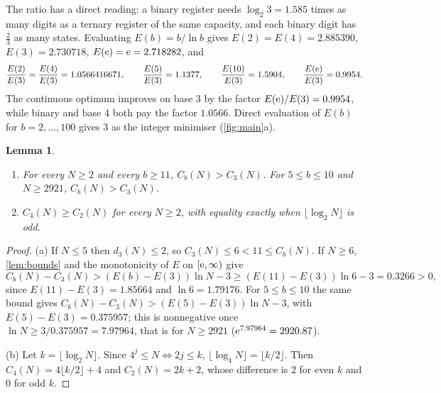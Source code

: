 \documentclass[11pt]{article}
\newtheorem{lemma}[theorem]{Lemma}
\theoremstyle{definition}\newtheorem{definition}[theorem]{Definition}
\theoremstyle{remark}\newtheorem{remark}[theorem]{Remark}
\begin{document}
The ratio has a direct reading: a binary register needs $\log_{2}3=1.585$ times as many digits as a ternary register of the same capacity, and each binary digit has $\frac23$ as many states. Evaluating $E(b)=b/\ln b$ gives $E(2)=E(4)=2.885390$, $E(3)=2.730718$, $E(\mathrm e)=\mathrm e=2.718282$, and
\[
\frac{E(2)}{E(3)}=\frac{E(4)}{E(3)}=1.0566416671,\qquad \frac{E(5)}{E(3)}=1.1377,\qquad \frac{E(10)}{E(3)}=1.5904,\qquad \frac{E(\mathrm e)}{E(3)}=0.9954 .
\]
The continuous optimum improves on base 3 by the factor $E(\mathrm e)/E(3)=0.9954$, while binary and base 4 both pay the factor $1.0566$. Direct evaluation of $E(b)$ for $b=2,\dots,100$ gives $3$ as the integer minimiser (\cref{fig:main}a).

\begin{lemma}\label{lem:large}
\leavevmode
\begin{enumerate}[label=\textup{(\alph*)}]
\item For every $N\ge2$ and every $b\ge11$, $C_b(N)>C_3(N)$. For $5\le b\le10$ and $N\ge2921$, $C_b(N)>C_3(N)$.
\item $C_4(N)\ge C_2(N)$ for every $N\ge2$, with equality exactly when $\lfloor\log_2 N\rfloor$ is odd.
\end{enumerate}
\end{lemma}
\begin{proof}
(a) If $N\le5$ then $d_3(N)\le2$, so $C_3(N)\le6<11\le C_b(N)$. If $N\ge6$, \cref{lem:bounds} and the monotonicity of $E$ on $[\mathrm e,\infty)$ give
\[
C_b(N)-C_3(N)>(E(b)-E(3))\ln N-3\ge(E(11)-E(3))\ln6-3=0.3266>0,
\]
since $E(11)-E(3)=1.85664$ and $\ln6=1.79176$.
For $5\le b\le10$ the same bound gives $C_b(N)-C_3(N)>(E(5)-E(3))\ln N-3$, with $E(5)-E(3)=0.375957$; this is nonnegative once $\ln N\ge3/0.375957=7.97964$, that is for $N\ge2921$ ($\mathrm e^{7.97964}=2920.87$).

(b) Let $k=\lfloor\log_2 N\rfloor$. Since $4^j\le N\iff 2j\le k$, $\lfloor\log_4 N\rfloor=\lfloor k/2\rfloor$. Then $C_4(N)=4\lfloor k/2\rfloor+4$ and $C_2(N)=2k+2$, whose difference is $2$ for even $k$ and $0$ for odd $k$.
\end{proof}
\end{document}
